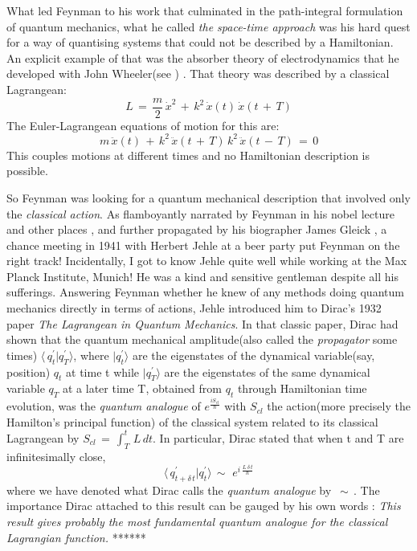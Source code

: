 \documentclass[a4paper]{JHEP3}
\newcommand{\be}{\begin{equation}}
\newcommand{\ee}{\end{equation}}
\begin{document}
What led Feynman to his work that culminated in the path-integral formulation of quantum mechanics, what he called {\it the space-time
approach}\cite{feynpaper} was his hard quest for a way of quantising systems that could not be described by a Hamiltonian. An explicit
example of that was the absorber theory of electrodynamics that he developed with John Wheeler(see \cite{thesis}) . That theory was
described by a classical Lagrangean: 
\be
\label{eq:absorberL}
L\,=\,\frac{m}{2}\,{\dot x}^2\,+\,k^2\,{\dot x}(t)\,{\dot x}(t\,+\,T)
\ee
The Euler-Lagrangean equations of motion for this are:
\be
\label{eq:absorberEOM}
m\,{\ddot x}(t)\,+\,k^2\,{\ddot x}(t\,+\,T)\,k^2\,{\ddot x}(t\,-\,T)\,=\,0
\ee
This couples motions at different times and no Hamiltonian description is possible.

So Feynman was looking for a quantum mechanical description that involved only the {\it classical action}. As flamboyantly narrated by 
Feynman in his nobel lecture \cite{nobel} and other places \cite{joking}, and further propagated by his biographer
James Gleick \cite{gleick}, a chance meeting in 1941 with Herbert Jehle at a beer party put Feynman on the right track! Incidentally, 
I got to know Jehle quite well while working at the Max Planck Institute, Munich! He was a kind and sensitive gentleman despite all his 
sufferings. Answering Feynman whether he knew of any methods doing quantum mechanics directly in terms of actions, Jehle introduced him to 
Dirac's 1932 paper {\it The Lagrangean in Quantum Mechanics}\cite{diracpaper}. In that classic paper, Dirac had shown that the
quantum mechanical amplitude(also called the {\it propagator} some times) $ \langle\,q^\prime_t|q^\prime_T\rangle $,
where $|q^\prime_t\rangle$ are the eigenstates of the dynamical variable(say, position) $q_t$ at time t while $|q^\prime_T\rangle$
are the eigenstates of the same dynamical variable $q_T$ at a later time T, obtained from $q_t$ through Hamiltonian time evolution, was
the {\it quantum analogue} of $ e^{\frac{iS_{cl}}{\hbar}} $ with $S_{cl}$ the action(more precisely the Hamilton's principal function) of the 
classical system related to its classical Lagrangean by $ S_{cl}\,=\,\int_T^{t}\,L\,dt $. In particular, Dirac stated that when t and T are 
infinitesimally close,
\be
\label{eq:qanalogue}
\langle\,q^\prime_{t+\delta\,t}|q^\prime_t\rangle\,\sim\,\, e^{i\,\frac {L\,\delta\,t}{\hbar}}
\ee
where we have denoted what Dirac calls the {\it quantum analogue} by $\,\sim\,$. The importance Dirac attached to this result can be gauged
by his own words \cite{diracbook2}: {\it This result gives probably the most fundamental quantum analogue for the classical Lagrangian 
function.}
******
\end{document}
